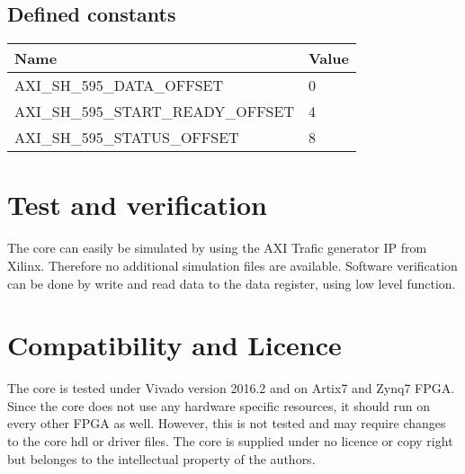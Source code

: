 \subsection{Defined constants}

\begin{table}[h]
	\centering
	\label{tbl::software_defines}
	\begin{tabular}{l|l}
		Name & Value \\
		\hline 
		AXI\_SH\_595\_DATA\_OFFSET & 0 \\
		\hline 
		AXI\_SH\_595\_START\_READY\_OFFSET & 4 \\
		\hline 
		AXI\_SH\_595\_STATUS\_OFFSET & 8 \\
	\end{tabular} 
	
\end{table}


\section{Test and verification}
\label{sec::test}

The core can easily be simulated by using the AXI Trafic generator IP from Xilinx.
Therefore no additional simulation files are available.
Software verification can be done by write and read data to the data register, using low level function.

\section{Compatibility and Licence}
The core is tested under Vivado version 2016.2 and on Artix7 and Zynq7 FPGA.
Since the core does not use any hardware specific resources, it should run on every other FPGA as well.
However, this is not tested and may require changes to the core hdl or driver files.
The core is supplied under no licence or copy right but belonges to the intellectual property of the authors.

